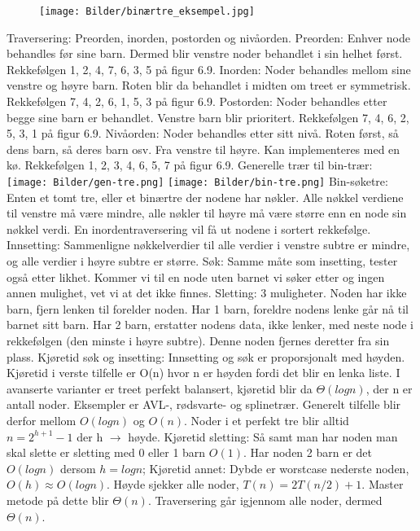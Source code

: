 \documentclass[10pt,a4paper]{article}
\begin{document}
\begin{multicols}{4}
{\noindent
\begin{figure}[H]
    \texttt{[image: Bilder/binærtre\_eksempel.jpg]}
\end{figure}

\noindent
\color{red}Traversering\color{black}:
Preorden, inorden, postorden og nivåorden.
\color{orange}Preorden\color{black}: Enhver node behandles før sine barn. Dermed blir venstre noder behandlet i sin helhet først. Rekkefølgen 1, 2, 4, 7, 6, 3, 5 på figur 6.9.
\color{orange}Inorden\color{black}: Noder behandles mellom sine venstre og høyre barn. Roten blir da behandlet i midten om treet er symmetrisk. Rekkefølgen 7, 4, 2, 6, 1, 5, 3 på figur 6.9.
\color{orange}Postorden\color{black}: Noder behandles etter begge sine barn er behandlet. Venstre barn blir prioritert. Rekkefølgen 7, 4, 6, 2, 5, 3, 1 på figur 6.9.
\color{orange}Nivåorden\color{black}: Noder behandles etter sitt nivå. Roten først, så dens barn, så deres barn osv. Fra venstre til høyre. Kan implementeres med en kø. Rekkefølgen 1, 2, 3, 4, 6, 5, 7 på figur 6.9.
\color{orange}Generelle trær til bin-trær\color{black}:\newline
\texttt{[image: Bilder/gen-tre.png]}
\texttt{[image: Bilder/bin-tre.png]}
\noindent
\color{red}Bin-søketre\color{black}:
Enten et tomt tre, eller et binærtre der nodene har nøkler. Alle nøkkel verdiene til venstre må være mindre, alle nøkler til høyre må være større enn en node sin nøkkel verdi. En inordentraversering vil få ut nodene i sortert rekkefølge. \color{orange}Innsetting\color{black}: Sammenligne nøkkelverdier til alle verdier i venstre subtre er mindre, og alle verdier i høyre subtre er større. 
\noindent\color{orange}Søk\color{black}: Samme måte som insetting, tester også etter likhet. Kommer vi til en node uten barnet vi søker etter og ingen annen mulighet, vet vi at det ikke finnes.
\noindent\color{orange}Sletting\color{black}: 3 muligheter. Noden har ikke barn, fjern lenken til forelder noden. Har 1 barn, foreldre nodens lenke går nå til barnet sitt barn. Har 2 barn, erstatter nodens data, ikke lenker, med neste node i rekkefølgen (den minste i høyre subtre). Denne noden fjernes deretter fra sin plass.
\noindent\color{orange}Kjøretid søk og insetting\color{black}: Innsetting og søk er proporsjonalt med høyden. Kjøretid i verste tilfelle er O(n) hvor n er høyden fordi det blir en lenka liste. I avanserte varianter er treet perfekt balansert, kjøretid blir da $\Theta(log n)$, der n er antall noder. Eksempler er AVL-, rødsvarte- og splinetrær. Generelt tilfelle blir derfor mellom $O(logn)$ og $O(n)$. Noder i et perfekt tre blir alltid $n = 2^{h+1} - 1$ der h $\rightarrow$ høyde. 
\noindent\color{orange}Kjøretid sletting\color{black}: Så samt man har noden man skal slette er sletting med 0 eller 1 barn $O(1)$. Har noden 2 barn er det $O(logn)$ dersom $h = logn$;
\noindent\color{orange}Kjøretid annet\color{black}: Dybde er worstcase nederste noden, $O(h) \approx O(logn)$. Høyde sjekker alle noder, $T(n) = 2T(n/2) + 1$. Master metode på dette blir $\Theta(n)$. Traversering går igjennom alle noder, dermed $\Theta(n)$.

}
\end{multicols}
\end{document}
